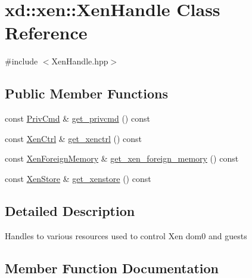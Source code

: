\hypertarget{classxd_1_1xen_1_1_xen_handle}{}\section{xd\+:\+:xen\+:\+:Xen\+Handle Class Reference}
\label{classxd_1_1xen_1_1_xen_handle}


{\ttfamily \#include $<$Xen\+Handle.\+hpp$>$}

\subsection*{Public Member Functions}
\begin{DoxyCompactItemize}
\item 
const \mbox{\hyperlink{classxd_1_1xen_1_1_priv_cmd}{Priv\+Cmd}} \& \mbox{\hyperlink{classxd_1_1xen_1_1_xen_handle_ab58f6a4fb4eecdbbe826b57ea42382d5}{get\+\_\+privcmd}} () const
\item 
const \mbox{\hyperlink{classxd_1_1xen_1_1_xen_ctrl}{Xen\+Ctrl}} \& \mbox{\hyperlink{classxd_1_1xen_1_1_xen_handle_a02d763db6b65715eba7a411c65e6b137}{get\+\_\+xenctrl}} () const
\item 
const \mbox{\hyperlink{classxd_1_1xen_1_1_xen_foreign_memory}{Xen\+Foreign\+Memory}} \& \mbox{\hyperlink{classxd_1_1xen_1_1_xen_handle_a1031e052f5f533a94c28ddbeaf5dc457}{get\+\_\+xen\+\_\+foreign\+\_\+memory}} () const
\item 
const \mbox{\hyperlink{classxd_1_1xen_1_1_xen_store}{Xen\+Store}} \& \mbox{\hyperlink{classxd_1_1xen_1_1_xen_handle_a97bb8a801b2012d674644724f7d80c7f}{get\+\_\+xenstore}} () const
\end{DoxyCompactItemize}


\subsection{Detailed Description}
Handles to various resources used to control Xen dom0 and guests 

\subsection{Member Function Documentation}
\mbox{\label{classxd_1_1xen_1_1_xen_handle_ab58f6a4fb4eecdbbe826b57ea42382d5}} 
